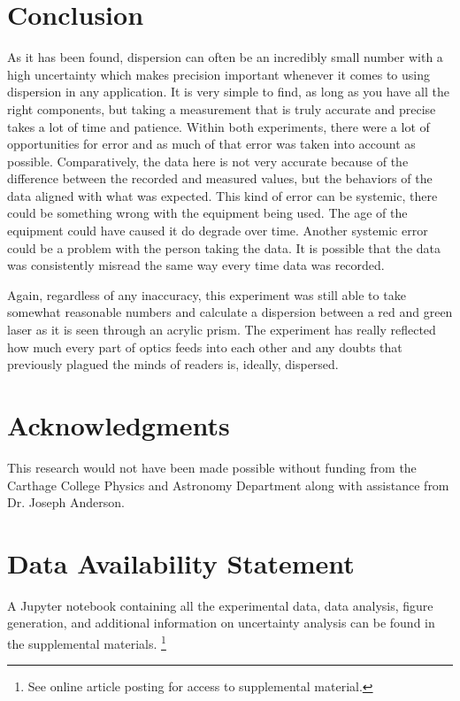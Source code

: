 \documentclass[rc,ec]{physicsinprogress}
\begin{document}
\section{Conclusion}
    As it has been found, dispersion can often be an incredibly small number with a high uncertainty which makes precision important whenever it comes to using dispersion in any application. It is very simple to find, as long as you have all the right components, but taking a measurement that is truly accurate and precise takes a lot of time and patience. Within both experiments, there were a lot of opportunities for error and as much of that error was taken into account as possible. Comparatively, the data here is not very accurate because of the difference between the recorded and measured values, but the behaviors of the data aligned with what was expected. This kind of error can be systemic, there could be something wrong with the equipment being used. The age of the equipment could have caused it do degrade over time. Another systemic error could be a problem with the person taking the data. It is possible that the data was consistently misread the same way every time data was recorded.

    Again, regardless of any inaccuracy, this experiment was still able to take somewhat reasonable numbers and calculate a dispersion between a red and green laser as it is seen through an acrylic prism. The experiment has really reflected how much every part of optics feeds into each other and any doubts that previously plagued the minds of readers is, ideally, dispersed.


\section*{Acknowledgments}
This research would not have been made possible without funding from the Carthage College Physics and Astronomy Department along with assistance from Dr. Joseph Anderson.

\section*{Data Availability Statement}
A Jupyter notebook containing all the experimental data, data analysis, figure generation, and additional information on uncertainty analysis can be found in the supplemental materials. \footnote{See online article posting for access to supplemental material.}



\end{document}
